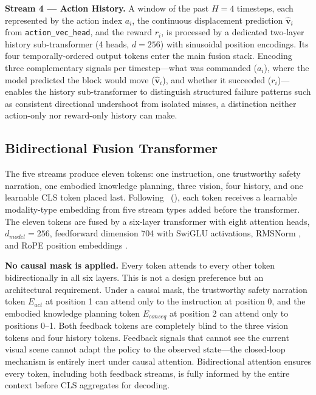 \documentclass[letterpaper]{article} %
\begin{document}
\textbf{Stream 4 --- Action History.} A window of the past $H{=}4$ timesteps, each represented by the action index $a_i$, the continuous displacement prediction $\hat{\mathbf{v}}_i$ from \texttt{action\_vec\_head}, and the reward $r_i$, is processed by a dedicated two-layer history sub-transformer (4 heads, $d{=}256$) with sinusoidal position encodings. Its four temporally-ordered output tokens enter the main fusion stack. Encoding three complementary signals per timestep---what was commanded ($a_i$), where the model predicted the block would move ($\hat{\mathbf{v}}_i$), and whether it succeeded ($r_i$)---enables the history sub-transformer to distinguish structured failure patterns such as consistent directional undershoot from isolated misses, a distinction neither action-only nor reward-only history can make.

\subsection{Bidirectional Fusion Transformer}

The five streams produce eleven tokens: one instruction, one trustworthy safety narration, one embodied knowledge planning, three vision, four history, and one learnable CLS token placed last. Following \citeauthor{kim2021vilt}~(\citeyear{kim2021vilt}), each token receives a learnable modality-type embedding from five stream types added before the transformer. The eleven tokens are fused by a six-layer transformer with eight attention heads, $d_{model}{=}256$, feedforward dimension 704 with SwiGLU \cite{shazeer2020swiglu} activations, RMSNorm \cite{zhang2019rmsnorm}, and RoPE position embeddings \cite{su2021rope}.

\textbf{No causal mask is applied.} Every token attends to every other token bidirectionally in all six layers. This is not a design preference but an architectural requirement. Under a causal mask, the trustworthy safety narration token $E_{act}$ at position 1 can attend only to the instruction at position 0, and the embodied knowledge planning token $E_{conseq}$ at position 2 can attend only to positions 0--1. Both feedback tokens are completely blind to the three vision tokens and four history tokens. Feedback signals that cannot see the current visual scene cannot adapt the policy to the observed state---the closed-loop mechanism is entirely inert under causal attention. Bidirectional attention ensures every token, including both feedback streams, is fully informed by the entire context before CLS aggregates for decoding.
\end{document}
